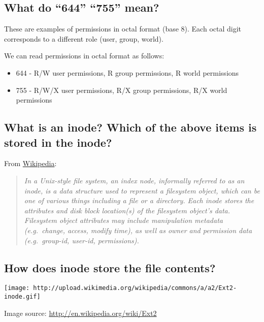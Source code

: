 \subsection{\texorpdfstring{What do ``644'' ``755''
mean?}{What do 644 755 mean?}}\label{what-do-644-755-mean}

These are examples of permissions in octal format (base 8). Each octal
digit corresponds to a different role (user, group, world).

We can read permissions in octal format as follows:

\begin{itemize}
\itemsep1pt\parskip0pt
\item
  644 - R/W user permissions, R group permissions, R world permissions\\
\item
  755 - R/W/X user permissions, R/X group permissions, R/X world
  permissions
\end{itemize}

\subsection{What is an inode? Which of the above items is stored in the
inode?}\label{what-is-an-inode-which-of-the-above-items-is-stored-in-the-inode}

From \href{http://en.wikipedia.org/wiki/Inode}{Wikipedia}:

\begin{quote}
\emph{In a Unix-style file system, an index node, informally referred to
as an inode, is a data structure used to represent a filesystem object,
which can be one of various things including a file or a directory. Each
inode stores the attributes and disk block location(s) of the filesystem
object's data. Filesystem object attributes may include manipulation
metadata (e.g.~change, access, modify time), as well as owner and
permission data (e.g.~group-id, user-id, permissions).}
\end{quote}

\subsection{How does inode store the file
contents?}\label{how-does-inode-store-the-file-contents}

\texttt{[image: http://upload.wikimedia.org/wikipedia/commons/a/a2/Ext2-inode.gif]}

Image source: \url{http://en.wikipedia.org/wiki/Ext2}

